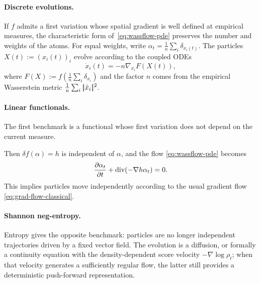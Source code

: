 \paragraph{Discrete evolutions.}

If $f$ admits a first variation whose spatial gradient is well defined at empirical measures, the characteristic form of~\eqref{eq:wassflow-pde} preserves the number and weights of the atoms. For equal weights, write $\alpha_t = \frac{1}{n} \sum_i \delta_{x_i(t)}$. The particles $X(t) := (x_i(t))_i$ evolve according to the coupled ODEs
\begin{equation}
    \dot{x}_i(t) = -n\nabla_{x_i} F(X(t)), \label{eq:wassflows-particles}
\end{equation}
where $F(X) := f\left(\frac{1}{n} \sum_i \delta_{x_i}\right)$ and the factor $n$ comes from the empirical Wasserstein metric $\frac1n\sum_i |\!| \dot x_i |\!|^2$.


\paragraph{Linear functionals.}

The first benchmark is a functional whose first variation does not depend on the current measure.

\begin{example}
   Then $\delta f(\alpha) = h$ is independent of $\alpha$, and the flow \eqref{eq:wassflow-pde} becomes
   \begin{equation*}
       \frac{\partial \alpha_t}{\partial t} + \operatorname{div}(-\nabla h \alpha_t) = 0.
   \end{equation*}
   This implies particles move independently according to the usual gradient flow \eqref{eq:grad-flow-classical}.
\end{example}

\paragraph{Shannon neg-entropy.}


Entropy gives the opposite benchmark: particles are no longer independent trajectories driven by a fixed vector field. The evolution is a diffusion, or formally a continuity equation with the density-dependent score velocity $-\nabla\log\rho_t$; when that velocity generates a sufficiently regular flow, the latter still provides a deterministic push-forward representation.

